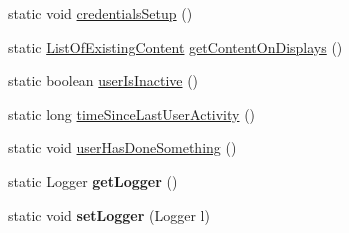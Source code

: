 \begin{DoxyCompactItemize}
\item 
static void \hyperlink{classgov_1_1fnal_1_1ppd_1_1dd_1_1GlobalVariables_a3beb933e8664bc5cf625f37d4e0ad429}{credentials\-Setup} ()
\item 
static \hyperlink{classgov_1_1fnal_1_1ppd_1_1dd_1_1changer_1_1ListOfExistingContent}{List\-Of\-Existing\-Content} \hyperlink{classgov_1_1fnal_1_1ppd_1_1dd_1_1GlobalVariables_a5dee2a221fa2d94a5baa8558800845e3}{get\-Content\-On\-Displays} ()
\item 
static boolean \hyperlink{classgov_1_1fnal_1_1ppd_1_1dd_1_1GlobalVariables_aba515ddabffe804f9830689e02ef0cda}{user\-Is\-Inactive} ()
\item 
static long \hyperlink{classgov_1_1fnal_1_1ppd_1_1dd_1_1GlobalVariables_a7480064c523e0ebb558122616d32544f}{time\-Since\-Last\-User\-Activity} ()
\item 
static void \hyperlink{classgov_1_1fnal_1_1ppd_1_1dd_1_1GlobalVariables_a526d778baf99fcb1eb1648e91c5e346d}{user\-Has\-Done\-Something} ()
\item 
\hypertarget{classgov_1_1fnal_1_1ppd_1_1dd_1_1GlobalVariables_a5f0114f559702931f77f0e571be95752}{static Logger {\bfseries get\-Logger} ()}\label{classgov_1_1fnal_1_1ppd_1_1dd_1_1GlobalVariables_a5f0114f559702931f77f0e571be95752}

\item 
\hypertarget{classgov_1_1fnal_1_1ppd_1_1dd_1_1GlobalVariables_a14e776ad97d0c10931fd61205c9d2b6f}{static void {\bfseries set\-Logger} (Logger l)}\label{classgov_1_1fnal_1_1ppd_1_1dd_1_1GlobalVariables_a14e776ad97d0c10931fd61205c9d2b6f}

\end{DoxyCompactItemize}
